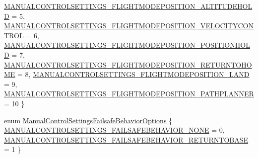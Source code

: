 \begin{DoxyCompactItemize}
\hyperlink{group___manual_control_settings_gga5935c8977b39792a0ec5d4512eec6b53a66601a0d38378ff27836a40421665d68}{\-M\-A\-N\-U\-A\-L\-C\-O\-N\-T\-R\-O\-L\-S\-E\-T\-T\-I\-N\-G\-S\-\_\-\-F\-L\-I\-G\-H\-T\-M\-O\-D\-E\-P\-O\-S\-I\-T\-I\-O\-N\-\_\-\-A\-L\-T\-I\-T\-U\-D\-E\-H\-O\-L\-D} = 5, 
\hyperlink{group___manual_control_settings_gga5935c8977b39792a0ec5d4512eec6b53a6089a7470d6e3ac1381cbafc111e561f}{\-M\-A\-N\-U\-A\-L\-C\-O\-N\-T\-R\-O\-L\-S\-E\-T\-T\-I\-N\-G\-S\-\_\-\-F\-L\-I\-G\-H\-T\-M\-O\-D\-E\-P\-O\-S\-I\-T\-I\-O\-N\-\_\-\-V\-E\-L\-O\-C\-I\-T\-Y\-C\-O\-N\-T\-R\-O\-L} = 6, 
\hyperlink{group___manual_control_settings_gga5935c8977b39792a0ec5d4512eec6b53a3971fd0e629ac5f31f7e54dc7c8cf23d}{\-M\-A\-N\-U\-A\-L\-C\-O\-N\-T\-R\-O\-L\-S\-E\-T\-T\-I\-N\-G\-S\-\_\-\-F\-L\-I\-G\-H\-T\-M\-O\-D\-E\-P\-O\-S\-I\-T\-I\-O\-N\-\_\-\-P\-O\-S\-I\-T\-I\-O\-N\-H\-O\-L\-D} = 7, 
\*
\hyperlink{group___manual_control_settings_gga5935c8977b39792a0ec5d4512eec6b53a02c84ed23e0b5e48c4fc7246f23a316c}{\-M\-A\-N\-U\-A\-L\-C\-O\-N\-T\-R\-O\-L\-S\-E\-T\-T\-I\-N\-G\-S\-\_\-\-F\-L\-I\-G\-H\-T\-M\-O\-D\-E\-P\-O\-S\-I\-T\-I\-O\-N\-\_\-\-R\-E\-T\-U\-R\-N\-T\-O\-H\-O\-M\-E} = 8, 
\hyperlink{group___manual_control_settings_gga5935c8977b39792a0ec5d4512eec6b53a0ea17b13f9d730e06c6f99dd1adc028f}{\-M\-A\-N\-U\-A\-L\-C\-O\-N\-T\-R\-O\-L\-S\-E\-T\-T\-I\-N\-G\-S\-\_\-\-F\-L\-I\-G\-H\-T\-M\-O\-D\-E\-P\-O\-S\-I\-T\-I\-O\-N\-\_\-\-L\-A\-N\-D} = 9, 
\hyperlink{group___manual_control_settings_gga5935c8977b39792a0ec5d4512eec6b53a9ec650a9b4c7c8923b3b45e1ff4edfe8}{\-M\-A\-N\-U\-A\-L\-C\-O\-N\-T\-R\-O\-L\-S\-E\-T\-T\-I\-N\-G\-S\-\_\-\-F\-L\-I\-G\-H\-T\-M\-O\-D\-E\-P\-O\-S\-I\-T\-I\-O\-N\-\_\-\-P\-A\-T\-H\-P\-L\-A\-N\-N\-E\-R} = 10
 \}
\item 
enum \hyperlink{group___manual_control_settings_ga7899e1b74135b25a55c62de3558c35e8}{\-Manual\-Control\-Settings\-Failsafe\-Behavior\-Options} \{ \hyperlink{group___manual_control_settings_gga7899e1b74135b25a55c62de3558c35e8a46792e1acf0d60f9576833cb66156f58}{\-M\-A\-N\-U\-A\-L\-C\-O\-N\-T\-R\-O\-L\-S\-E\-T\-T\-I\-N\-G\-S\-\_\-\-F\-A\-I\-L\-S\-A\-F\-E\-B\-E\-H\-A\-V\-I\-O\-R\-\_\-\-N\-O\-N\-E} = 0, 
\hyperlink{group___manual_control_settings_gga7899e1b74135b25a55c62de3558c35e8a17b7f1108e1910c24004f03edb4edc2f}{\-M\-A\-N\-U\-A\-L\-C\-O\-N\-T\-R\-O\-L\-S\-E\-T\-T\-I\-N\-G\-S\-\_\-\-F\-A\-I\-L\-S\-A\-F\-E\-B\-E\-H\-A\-V\-I\-O\-R\-\_\-\-R\-E\-T\-U\-R\-N\-T\-O\-B\-A\-S\-E} = 1
 \}
\end{DoxyCompactItemize}
